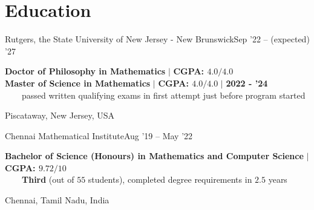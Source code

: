 \vspace{\gap}

\section{Education}
\resumeSubheading
{Rutgers, the State University of New Jersey - New Brunswick}{Sep '22 -- (expected) '27}
{\begin{minipage}{15cm} \color{grey}\textbf{Doctor of Philosophy in Mathematics}  $|$ \textbf{CGPA: $4.0/4.0$}\\
\textbf{Master of Science in Mathematics}  $|$ \textbf{CGPA: $4.0/4.0$} $|$ \textbf{\color{black}2022 - '24}\\
$\phantom{\qquad}$passed written qualifying exams in first attempt just before program started \end{minipage}
}{Piscataway, New Jersey, USA}

\resumeSubheading
{Chennai Mathematical Institute}{Aug '19 -- May '22}
{\begin{minipage}{15cm} \color{grey}\textbf{Bachelor of Science (Honours) in Mathematics and Computer Science} $|$ \textbf{CGPA: $9.72/10$} \\
$\phantom{\qquad}$\textbf{Third} (out of $55$ students), completed degree requirements in $2.5$ years\end{minipage}
}{Chennai, Tamil Nadu, India}
      
\vspace{\gap}

